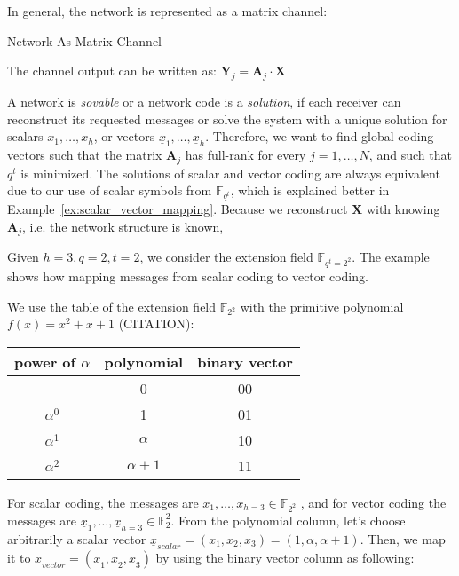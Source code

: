 In general, the network is represented as a matrix channel:
\begin{defn}
Network As Matrix Channel

The channel output can be written as: $\boldsymbol{Y}_{j}=\boldsymbol{A}_{j}\cdot\boldsymbol{X}$
\end{defn}
A network is \textit{sovable} or a network code is a \textit{solution},
if each receiver can reconstruct its requested messages or solve the
system with a unique solution for scalars $x_{1},\ldots,x_{h}$, or
vectors $\underline{x}_{1},\ldots,\underline{x}_{h}$. Therefore,
we want to find global coding vectors such that the matrix $\boldsymbol{A}_{j}$
has full-rank for every $j=1,\ldots,N$, and such that $q^{t}$ is
minimized. The solutions of scalar and vector coding are always equivalent
due to our use of scalar symbols from $\ensuremath{\mathbb{F}}_{q^{t}}$,
which is explained better in Example~\ref{ex:scalar_vector_mapping}.
Because we reconstruct $\boldsymbol{X}$ with knowing $\boldsymbol{A}_{j}$,
i.e. the network structure is known, 
\begin{example}
\label{ex:scalar_vector_mapping} 

Given $h=3,q=2,t=2$, we consider the extension field $\ensuremath{\mathbb{F}}_{q^{t}=2^{2}}$.
The example shows how mapping messages from scalar coding to vector
coding.

We use the table of the extension field $\ensuremath{\mathbb{F}}_{2^{2}}$
with the primitive polynomial $f(x)=x^{2}+x+1$ (CITATION):
\end{example}
\begin{tabular}{|c|c|c|}
\hline 
power of $\alpha$ & polynomial & binary vector\tabularnewline
\hline 
- & 0 & 00\tabularnewline
\hline 
$\alpha^{0}$ & 1 & 01\tabularnewline
\hline 
$\alpha^{1}$ & $\alpha$ & 10\tabularnewline
\hline 
$\alpha^{2}$ & $\alpha+1$ & 11\tabularnewline
\hline 
\end{tabular}

For scalar coding, the messages are $x_{1},\ldots,x_{h=3}\in\ensuremath{\mathbb{F}}_{2^{2}}$
, and for vector coding the messages are $\underline{x}_{1},\ldots,\underline{x}_{h=3}\in\ensuremath{\mathbb{F}}_{2}^{2}$.
From the polynomial column, let's choose arbitrarily a scalar vector
$\underline{x}_{scalar}=(x_{1},x_{2},x_{3})=(1,\alpha,\alpha+1)$.
Then, we map it to $\underline{x}_{vector}=(\underline{x}_{1},\underline{x}_{2},\underline{x}_{3})$
by using the binary vector column as following:

